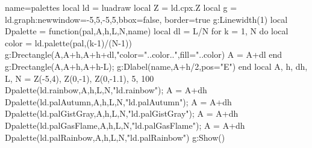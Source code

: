 \begin{luadraw}{name=palettes}
local ld = luadraw
local Z = ld.cpx.Z
local g = ld.graph:new{window={-5,5,-5,5},bbox=false, border=true}
g:Linewidth(1)
local Dpalette = function(pal,A,h,L,N,name)
    local dl = L/N
    for k = 1, N do
        local color = ld.palette(pal,(k-1)/(N-1))
        g:Drectangle(A,A+h,A+h+dl,"color="..color..",fill="..color)
        A = A+dl
    end
    g:Drectangle(A,A+h,A+h-L); g:Dlabel(name,A+h/2,{pos="E"})
end
local A, h, dh, L, N = Z(-5,4), Z(0,-1), Z(0,-1.1), 5, 100
Dpalette(ld.rainbow,A,h,L,N,"ld.rainbow"); A = A+dh
Dpalette(ld.palAutumn,A,h,L,N,"ld.palAutumn"); A = A+dh
Dpalette(ld.palGistGray,A,h,L,N,"ld.palGistGray"); A = A+dh
Dpalette(ld.palGasFlame,A,h,L,N,"ld.palGasFlame"); A = A+dh
Dpalette(ld.palRainbow,A,h,L,N,"ld.palRainbow")
g:Show()
\end{luadraw}
